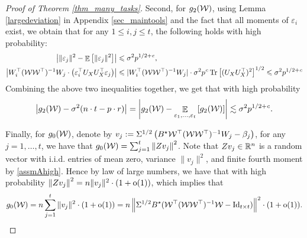 \begin{proof}[Proof of Theorem \ref{thm_many_tasks}]
	Second, for $g_2(\cW)$, using Lemma \ref{largedeviation} in Appendix \ref{sec_maintools} and the fact that all moments of $\varepsilon_i$ exist, we obtain that for any $1\le i, j \le t$, the following holds with high probability:
	\begin{align*}
		\bigabs{\norm{\varepsilon_j}^2 - \ex{\norm{\varepsilon_j}^2}} &\le \sigma^2 p^{1/2+\e},\\
		\abs{W_i^{\top} (\cW\cW^{\top})^{-1} W_j \cdot \bigbrace{\varepsilon_i^{\top} U_X U_X^{\top} \varepsilon_j}}
		&\le |W_i^{\top} (\cW\cW^{\top})^{-1}W_j| \cdot \sigma^2 p^{\e} \bigtr{(U_X U_X^{\top})^2}^{1/2} \le \sigma^2 p^{1/2+\e}
	\end{align*}
	Combining the above two inequalities together, we get that with high probability
	\begin{align}
		\left|g_2(\cal W)-\sigma^2(n\cdot t - p\cdot r)\right|=\left|g_2(\cal W)- \exarg{\varepsilon_1, \dots, \varepsilon_t} {g_2(\cal W)}\right| \lesssim \sigma^2 p^{1/2+\e}. \label{eq_est_g2}
	\end{align}

	Finally, for $g_0(\cW)$, denote by $v_j:= \Sigma^{1/2}\left(B^{\star} \cW^{\top} (\cW\cW^{\top})^{-1} W_j -  \beta_j\right)$, for any $j = 1,\dots,t$, we have that $g_0(\cal W)= \sum_{j=1}^t\left\|Z v_j \right\|^2$.
	Note that $Zv_j\in \R^n$ is a random vector with i.i.d. entries of mean zero, variance $\|v_j\|^2$, and finite fourth moment by \eqref{assmAhigh}.
	Hence by law of large numbers, we have that with high probability
	${\left\|Z v_j \right\|^2 } = { n \|v_j\|^2} \cdot (1+\oo(1))$,
	which implies that
	\begin{align}
		g_0(\cal W)=n \sum_{j=1}^t \|v_j\|^2 \cdot (1+\oo(1)) = n \bignorm{\Sigma^{1/2} B^{\star} (\cW^{\top} (\cW \cW^{\top})^{-1} \cW - \id_{t\times t})}^2 \cdot (1+\oo(1)). \label{eq_est_g0}
	\end{align}


\end{proof}
